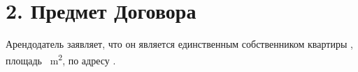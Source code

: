 \section*{2. Предмет Договора}
Арендодатель заявляет, что он является единственным собственником квартиры \Propunitnumber, площадь \Propaream~m\textsuperscript{2}, по адресу \Propaddress.
